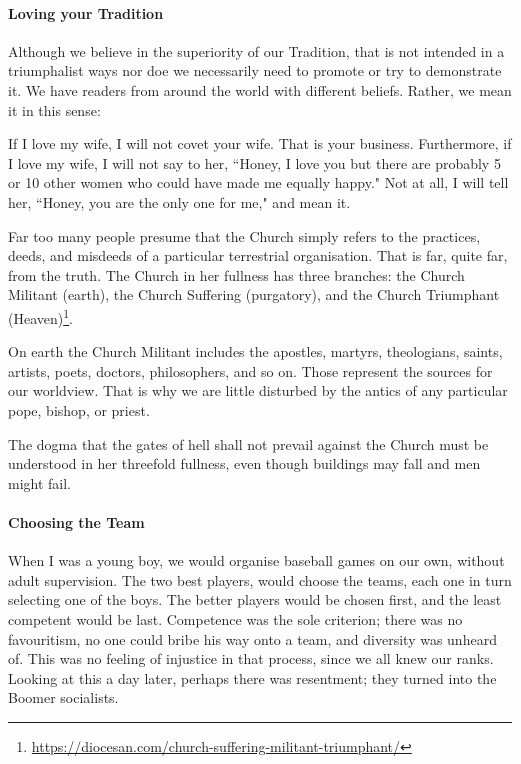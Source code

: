 \paragraph{Loving your Tradition}
Although we believe in the superiority of our Tradition, that is not intended in a triumphalist ways nor doe we necessarily need to promote or try to demonstrate it. We have readers from around the world with different beliefs. Rather, we mean it in this sense:

If I love my wife, I will not covet your wife. That is your business. Furthermore, if I love my wife, I will not say to her, ``Honey, I love you but there are probably 5 or 10 other women who could have made me equally happy." Not at all, I will tell her, ``Honey, you are the only one for me," and mean it.

Far too many people presume that the Church simply refers to the practices, deeds, and misdeeds of a particular terrestrial organisation. That is far, quite far, from the truth. The Church in her fullness has three branches: the Church Militant (earth), the Church Suffering (purgatory), and the Church Triumphant (Heaven)\footnote{\url{https://diocesan.com/church-suffering-militant-triumphant/}}.

On earth the Church Militant includes the apostles, martyrs, theologians, saints, artists, poets, doctors, philosophers, and so on. Those represent the sources for our worldview. That is why we are little disturbed by the antics of any particular pope, bishop, or priest.

The dogma that the gates of hell shall not prevail against the Church must be understood in her threefold fullness, even though buildings may fall and men might fail.

\paragraph{Choosing the Team}
When I was a young boy, we would organise baseball games on our own, without adult supervision. The two best players, would choose the teams, each one in turn selecting one of the boys. The better players would be chosen first, and the least competent would be last. Competence was the sole criterion; there was no favouritism, no one could bribe his way onto a team, and diversity was unheard of. This was no feeling of injustice in that process, since we all knew our ranks. Looking at this a day later, perhaps there was resentment; they turned into the Boomer socialists.

